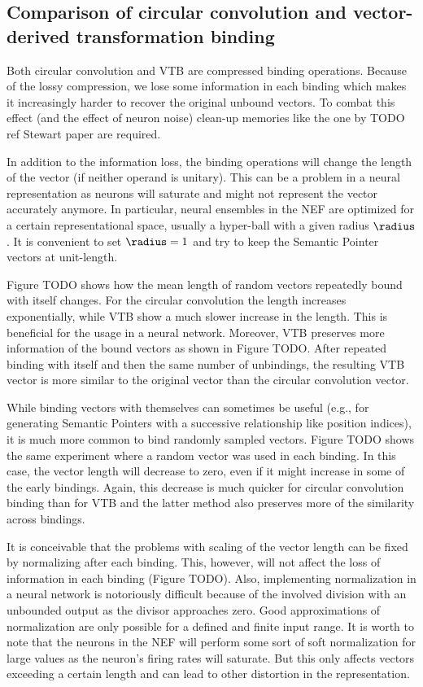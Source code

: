 \subsection{Comparison of circular convolution and vector-derived transformation binding}
Both circular convolution and VTB are compressed binding operations.
Because of the lossy compression, we lose some information in each binding which makes it increasingly harder to recover the original unbound vectors.
To combat this effect (and the effect of neuron noise) clean-up memories like the one by TODO ref Stewart paper are required.

In addition to the information loss, the binding operations will change the length of the vector (if neither operand is unitary).
This can be a problem in a neural representation as neurons will saturate and might not represent the vector accurately anymore.
In particular, neural ensembles in the NEF are optimized for a certain representational space, usually a hyper-ball with a given radius $\radius$.
It is convenient to set $\radius = 1$ and try to keep the Semantic Pointer vectors at unit-length.

Figure TODO shows how the mean length of random vectors repeatedly bound with itself changes.
For the circular convolution the length increases exponentially, while VTB show a much slower increase in the length.
This is beneficial for the usage in a neural network.
Moreover, VTB preserves more information of the bound vectors as shown in Figure TODO\@.
After repeated binding with itself and then the same number of unbindings, the resulting VTB vector is more similar to the original vector than the circular convolution vector.

While binding vectors with themselves can sometimes be useful (e.g., for generating Semantic Pointers with a successive relationship like position indices), it is much more common to bind randomly sampled vectors.
Figure TODO shows the same experiment where a random vector was used in each binding.
In this case, the vector length will decrease to zero, even if it might increase in some of the early bindings.
Again, this decrease is much quicker for circular convolution binding than for VTB and the latter method also preserves more of the similarity across bindings.

It is conceivable that the problems with scaling of the vector length can be fixed by normalizing after each binding.
This, however, will not affect the loss of information in each binding (Figure TODO).
Also, implementing normalization in a neural network is notoriously difficult because of the involved division with an unbounded output as the divisor approaches zero.
Good approximations of normalization are only possible for a defined and finite input range.
It is worth to note that the neurons in the NEF will perform some sort of soft normalization for large values as the neuron's firing rates will saturate.
But this only affects vectors exceeding a certain length and can lead to other distortion in the representation.

